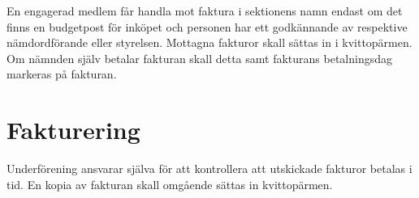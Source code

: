 \documentclass{../resources/dgovdoc}
\begin{document}
En engagerad medlem får handla mot faktura i sektionens namn endast om det finns en budgetpost för inköpet och personen har ett godkännande av respektive nämdordförande eller styrelsen. Mottagna fakturor skall sättas in i kvittopärmen. Om nämnden själv betalar fakturan skall detta samt fakturans betalningsdag markeras på fakturan. 

\section{Fakturering}

Underförening ansvarar själva för att kontrollera att utskickade fakturor betalas i tid. En kopia av fakturan skall omgående sättas in kvittopärmen. 
\end{document}
